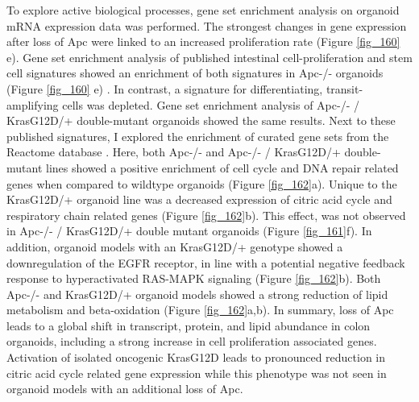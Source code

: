 \begin{flushleft}
To explore active biological processes, gene set enrichment analysis on organoid mRNA expression data was performed. The strongest changes in gene expression after loss of Apc were linked to an increased proliferation rate (Figure \ref{fig_160} e). Gene set enrichment analysis of published intestinal cell-proliferation and stem cell signatures showed an enrichment of both signatures in Apc-/- organoids (Figure \ref{fig_160} e) \cite{Merlos-Suarez2011-gd}. In contrast, a signature for differentiating, transit-amplifying cells was depleted. Gene set enrichment analysis of Apc-/- / KrasG12D/+ double-mutant organoids showed the same results. Next to these published signatures, I explored the enrichment of curated gene sets from the Reactome database \cite{Griss2020-qi}. Here, both Apc-/- and Apc-/- / KrasG12D/+ double-mutant lines showed a positive enrichment of cell cycle and DNA repair related genes when compared to wildtype organoids (Figure \ref{fig_162}a). Unique to the KrasG12D/+ organoid line was a decreased expression of citric acid cycle and respiratory chain related genes (Figure \ref{fig_162}b). This effect, was not observed in Apc-/- / KrasG12D/+ double mutant organoids (Figure \ref{fig_161}f). In addition, organoid models with an KrasG12D/+ genotype showed a downregulation of the EGFR receptor, in line with a potential negative feedback response to hyperactivated RAS-MAPK signaling (Figure \ref{fig_162}b). Both Apc-/- and KrasG12D/+ organoid models showed a strong reduction of lipid metabolism and beta-oxidation (Figure \ref{fig_162}a,b). In summary, loss of Apc leads to a global shift in transcript, protein, and lipid abundance in colon organoids, including a strong increase in cell proliferation associated genes. Activation of isolated oncogenic KrasG12D leads to pronounced reduction in citric acid cycle related gene expression while this phenotype was not seen in organoid models with an additional loss of Apc.


\end{flushleft}
